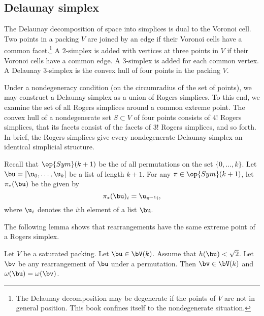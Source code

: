 \subsection{Delaunay simplex}

The Delaunay decomposition of space into simplices is dual to the
Voronoi cell.  Two points in a packing $V$ are joined by an edge if
their Voronoi cells have a common facet.\footnote{The Delaunay
  decomposition may be degenerate if the points of $V$ are not in
  general position.  This book confines itself to the nondegenerate
  situation.}  A $2$-simplex is added with vertices at three points in
$V$ if their Voronoi cells have a common edge.  A $3$-simplex is added
for each common vertex.  A Delaunay $3$-simplex is the convex hull of
four points in the packing $V$.

Under a nondegeneracy condition (on the circumradius of the set of
points), we may construct a Delaunay simplex as a union of Rogers
simplices.  To this end, we examine the set of all Rogers simplices
around a common extreme point.  The convex hull of a nondegenerate set
$S\subset V$ of four points consists of $4!$ Rogers simplices, that
its facets consist of the facets of $3!$ Rogers simplices, and so
forth.  In brief, the Rogers simplices give every nondegenerate
Delaunay simplex an identical simplicial structure.


Recall that $\op{Sym}(k+1)$ be the  of all permutations on the
set $\{0,\ldots,k\}$.  Let $\bu = [\u_0,\ldots, \u_k]$ be a list of
length $k+1$.  For any  $\pi\in\op{Sym}(k+1)$,
let $\pi_*(\bu)$ be the  given by
\begin{displaymath} 
\pi_*(\bu)_i =  \u_{\pi^{-1} i}, %
\end{displaymath}   
where $\u_i$ denotes the $i$th element of a list $\bu$.
%
%

The following lemma shows that rearrangements have the same extreme
point of a Rogers simplex.

\begin{lemma}   
\label{lemma:perm-Vk} 
  Let $V$ be a saturated packing.  Let $\bu\in \bV(k)$.  Assume that
  $h(\bu)<\sqrt2$. Let $\bv$ be any rearrangement of $\bu$ under a
  permutation.  Then $\bv\in \bV(k)$ and $\omega(\bu) = \omega(\bv)$.
\end{lemma}

